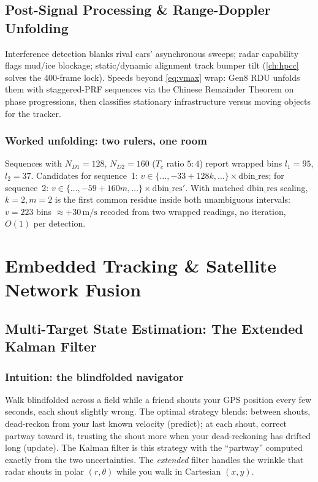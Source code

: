 \documentclass[11pt,oneside]{book}
\begin{document}
\chapter{Post-Signal Processing \& Range-Doppler Unfolding}
\label{ch:rdu}

Interference detection blanks rival cars' asynchronous sweeps; radar
capability flags mud/ice blockage; static/dynamic alignment track bumper
tilt (\cref{ch:hpcc} solves the 400-frame lock). Speeds beyond
\cref{eq:vmax} wrap: Gen8 RDU unfolds them with staggered-PRF sequences via
the Chinese Remainder Theorem on phase progressions, then classifies
stationary infrastructure versus moving objects for the tracker.

\section{Worked unfolding: two rulers, one room}
\label{sec:crt-numbers}

Sequences with $N_{D1}=128$, $N_{D2}=160$ ($T_c$ ratio $5{:}4$) report wrapped
bins $l_1=95$, $l_2=37$. Candidates for sequence~1:
$v\in\{\dots,-33+128k,\dots\}\times\mathrm{dbin\_res}$;
for sequence~2: $v\in\{\dots,-59+160m,\dots\}\times\mathrm{dbin\_res}'$.
With matched $\mathrm{dbin\_res}$ scaling, $k=2,m=2$ is the first common
residue inside both unambiguous intervals: $v=223$ bins $\approx+30\,\mathrm{m/s}$
recoded from two wrapped readings, no iteration, $O(1)$ per detection.

\part{Embedded Tracking \& Satellite Network Fusion}

\chapter{Multi-Target State Estimation: The Extended Kalman Filter}
\label{ch:ekf}

\section{Intuition: the blindfolded navigator}
\label{sec:navigator}

Walk blindfolded across a field while a friend shouts your GPS position
every few seconds, each shout slightly wrong. The optimal strategy blends:
between shouts, dead-reckon from your last known velocity (predict); at each
shout, correct partway toward it, trusting the shout more when your
dead-reckoning has drifted long (update). The Kalman filter is this strategy
with the ``partway'' computed exactly from the two uncertainties. The
\emph{extended} filter handles the wrinkle that radar shouts in polar
$(r,\theta)$ while you walk in Cartesian $(x,y)$.
\end{document}
